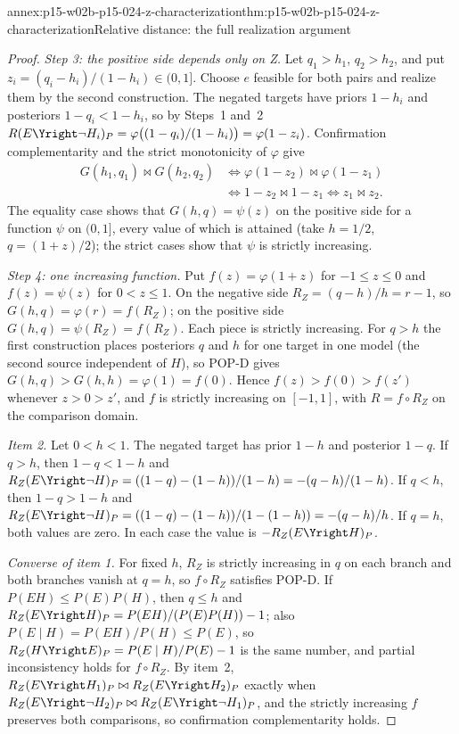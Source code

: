 \begin{annexitem}{annex:p15-w02b-p15-024-z-characterization}{thm:p15-w02b-p15-024-z-characterization}{Relative distance: the full realization argument}
\begin{proof}
\emph{Step 3: the positive side depends only on Z.} Let
\(q_1>h_1\), \(q_2>h_2\), and put \(z_i=(q_i-h_i)/(1-h_i)\in(0,1]\).
Choose \(e\) feasible for both pairs and realize them by the second
construction. The negated targets have priors \(1-h_i\) and posteriors
\(1-q_i<1-h_i\), so by Steps~1 and~2
\(R(E\Yright\neg H_i)_P=\varphi\bigl((1-q_i)/(1-h_i)\bigr)
=\varphi(1-z_i)\). Confirmation complementarity and the strict
monotonicity of \(\varphi\) give
\[
 \begin{aligned}
 G(h_1,q_1)\bowtie G(h_2,q_2)
 &\iff\varphi(1-z_2)\bowtie\varphi(1-z_1)\\
 &\iff 1-z_2\bowtie1-z_1
 \iff z_1\bowtie z_2 .
 \end{aligned}
\]
The equality case shows that \(G(h,q)=\psi(z)\) on the positive side
for a function \(\psi\) on \((0,1]\), every value of which is attained
(take \(h=1/2\), \(q=(1+z)/2\)); the strict cases show that \(\psi\) is
strictly increasing.

\emph{Step 4: one increasing function.} Put \(f(z)=\varphi(1+z)\) for
\(-1\leq z\leq0\) and \(f(z)=\psi(z)\) for \(0<z\leq1\). On the negative
side \(R_Z=(q-h)/h=r-1\), so \(G(h,q)=\varphi(r)=f(R_Z)\); on the
positive side \(G(h,q)=\psi(R_Z)=f(R_Z)\). Each piece is strictly
increasing. For \(q>h\) the first construction places posteriors \(q\)
and \(h\) for one target in one model (the second source independent of
\(H\)), so POP-D gives \(G(h,q)>G(h,h)=\varphi(1)=f(0)\). Hence
\(f(z)>f(0)>f(z')\) whenever \(z>0>z'\), and \(f\) is strictly
increasing on \([-1,1]\), with \(R=f\circ R_Z\) on the comparison domain.

\emph{Item 2.} Let \(0<h<1\). The negated target has prior \(1-h\) and
posterior \(1-q\). If \(q>h\), then \(1-q<1-h\) and
\(R_Z(E\Yright\neg H)_P=((1-q)-(1-h))/(1-h)=-(q-h)/(1-h)\). If
\(q<h\), then \(1-q>1-h\) and
\(R_Z(E\Yright\neg H)_P=((1-q)-(1-h))/(1-(1-h))=-(q-h)/h\). If \(q=h\),
both values are zero. In each case the value is \(-R_Z(E\Yright H)_P\).

\emph{Converse of item 1.} For fixed \(h\), \(R_Z\) is strictly
increasing in \(q\) on each branch and both branches vanish at
\(q=h\), so \(f\circ R_Z\) satisfies POP-D. If
\(P(EH)\leq P(E)P(H)\), then \(q\leq h\) and
\(R_Z(E\Yright H)_P=P(EH)/(P(E)P(H))-1\); also
\(P(E\mid H)=P(EH)/P(H)\leq P(E)\), so
\(R_Z(H\Yright E)_P=P(E\mid H)/P(E)-1\) is the same number, and
partial inconsistency holds for \(f\circ R_Z\). By item~2,
\(R_Z(E\Yright H_1)_P\bowtie R_Z(E\Yright H_2)_P\) exactly when
\(R_Z(E\Yright\neg H_2)_P\bowtie R_Z(E\Yright\neg H_1)_P\), and the
strictly increasing \(f\) preserves both comparisons, so confirmation
complementarity holds.


\end{proof}
\end{annexitem}
